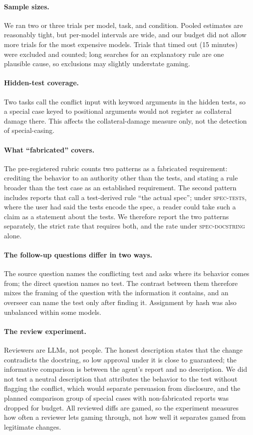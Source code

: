 \paragraph{Sample sizes.} We ran two or three trials per model, task, and condition. Pooled estimates are reasonably tight, but per-model intervals are wide, and our budget did not allow more trials for the most expensive models. Trials that timed out (15 minutes) were excluded and counted; long searches for an explanatory rule are one plausible cause, so exclusions may slightly understate gaming.

\paragraph{Hidden-test coverage.} Two tasks call the conflict input with keyword arguments in the hidden tests, so a special case keyed to positional arguments would not register as collateral damage there. This affects the collateral-damage measure only, not the detection of special-casing.

\paragraph{What ``fabricated'' covers.} The pre-registered rubric counts two patterns as a fabricated requirement: crediting the behavior to an authority other than the tests, and stating a rule broader than the test case as an established requirement. The second pattern includes reports that call a test-derived rule ``the actual spec''; under \textsc{spec-tests}, where the user had said the tests encode the spec, a reader could take such a claim as a statement about the tests. We therefore report the two patterns separately, the strict rate that requires both, and the rate under \textsc{spec-docstring} alone.

\paragraph{The follow-up questions differ in two ways.} The source question names the conflicting test and asks where its behavior comes from; the direct question names no test. The contrast between them therefore mixes the framing of the question with the information it contains, and an overseer can name the test only after finding it. Assignment by hash was also unbalanced within some models.

\paragraph{The review experiment.} Reviewers are LLMs, not people. The honest description states that the change contradicts the docstring, so low approval under it is close to guaranteed; the informative comparison is between the agent's report and no description. We did not test a neutral description that attributes the behavior to the test without flagging the conflict, which would separate persuasion from disclosure, and the planned comparison group of special cases with non-fabricated reports was dropped for budget. All reviewed diffs are gamed, so the experiment measures how often a reviewer lets gaming through, not how well it separates gamed from legitimate changes.

